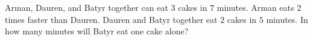 Arman, Dauren, and Batyr together can eat $3$ cakes in $7$ minutes. Arman eats $2$ times faster than Dauren. Dauren and Batyr together eat $2$ cakes in $5$ minutes. In how many minutes will Batyr eat one cake alone?
